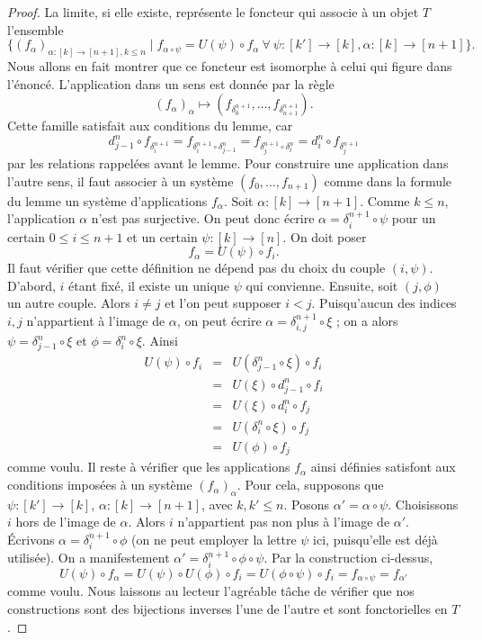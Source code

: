 \begin{proof}
La limite, si elle existe, représente le foncteur qui associe à un objet
$T$ l'ensemble
$$
\{
(f_\alpha)_{\alpha : [k] \to [n + 1], k \leq n}
\mid
f_{\alpha \circ \psi} = U(\psi) \circ f_\alpha\ \forall
\ \psi : [k'] \to [k], \alpha : [k] \to [n + 1]
\}.
$$
Nous allons en fait montrer que ce foncteur est isomorphe à celui qui
figure dans l'énoncé. L'application dans un sens est donnée par la règle
$$
(f_\alpha)_{\alpha}
\longmapsto
(f_{\delta^{n + 1}_0}, \ldots, f_{\delta^{n + 1}_{n + 1}}).
$$
Cette famille satisfait aux conditions du lemme, car
$$
d^n_{j - 1} \circ f_{\delta^{n + 1}_i} =
f_{\delta^{n + 1}_i \circ \delta^n_{j - 1}} =
f_{\delta^{n + 1}_j \circ \delta^n_i} =
d^n_i \circ f_{\delta^{n + 1}_j}
$$
par les relations rappelées avant le lemme. Pour construire une
application dans l'autre sens, il faut associer à un système
$(f_0, \ldots, f_{n + 1})$ comme dans la formule du lemme un système
d'applications $f_\alpha$. Soit $\alpha : [k] \to [n + 1]$. Comme
$k \leq n$, l'application $\alpha$ n'est pas surjective. On peut donc
écrire $\alpha = \delta^{n + 1}_i \circ \psi$ pour un certain
$0 \leq i \leq n + 1$ et un certain $\psi : [k] \to [n]$. On doit poser
$$
f_\alpha = U(\psi) \circ f_i.
$$
Il faut vérifier que cette définition ne dépend pas du choix du couple
$(i, \psi)$. D'abord, $i$ étant fixé, il existe un unique $\psi$ qui
convienne. Ensuite, soit $(j, \phi)$ un autre couple. Alors
$i \not = j$ et l'on peut supposer $i < j$. Puisqu'aucun des indices
$i, j$ n'appartient à l'image de $\alpha$, on peut écrire
$\alpha = \delta^{n + 1}_{i, j} \circ \xi$ ; on a alors
$\psi = \delta^n_{j - 1} \circ \xi$ et
$\phi = \delta^n_i \circ \xi$. Ainsi
\begin{eqnarray*}
U(\psi) \circ f_i & = & U(\delta^n_{j - 1} \circ \xi) \circ f_i \\
& = & U(\xi) \circ d^n_{j - 1} \circ f_i \\
& = & U(\xi) \circ d^n_i \circ f_j \\
& = & U(\delta^n_i \circ \xi) \circ f_j \\
& = & U(\phi) \circ f_j
\end{eqnarray*}
comme voulu. Il reste à vérifier que les applications $f_\alpha$ ainsi
définies satisfont aux conditions imposées à un système
$(f_\alpha)_\alpha$. Pour cela, supposons que
$\psi : [k'] \to [k]$, $\alpha : [k] \to [n + 1]$, avec
$k, k' \leq n$. Posons $\alpha' = \alpha \circ \psi$.
Choisissons $i$ hors de l'image de $\alpha$. Alors $i$ n'appartient pas
non plus à l'image de $\alpha'$. Écrivons
$\alpha = \delta^{n + 1}_i \circ \phi$ (on ne peut employer la lettre
$\psi$ ici, puisqu'elle est déjà utilisée). On a manifestement
$\alpha' = \delta^{n + 1}_i \circ \phi \circ \psi$. Par la construction
ci-dessus,
$$
U(\psi) \circ f_\alpha = U(\psi) \circ U(\phi) \circ f_i
= U(\phi \circ \psi) \circ f_i = f_{\alpha \circ \psi} = f_{\alpha'}
$$
comme voulu. Nous laissons au lecteur l'agréable tâche de vérifier que
nos constructions sont des bijections inverses l'une de l'autre et sont
fonctorielles en $T$.
\end{proof}

